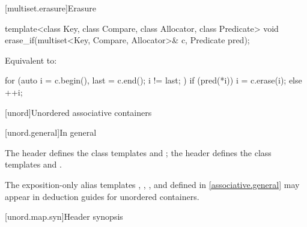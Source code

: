 [multiset.erasure]{Erasure}

%
\begin{itemdecl}
template<class Key, class Compare, class Allocator, class Predicate>
  void erase_if(multiset<Key, Compare, Allocator>& c, Predicate pred);
\end{itemdecl}

\begin{itemdescr}
\pnum
\effects
Equivalent to:
\begin{codeblock}
for (auto i = c.begin(), last = c.end(); i != last; ) {
  if (pred(*i)) {
    i = c.erase(i);
  } else {
    ++i;
  }
}
\end{codeblock}
\end{itemdescr}

[unord]{Unordered associative containers}

[unord.general]{In general}

\pnum
The header  defines the class templates
 and
; the header  defines the class templates
 and .

\pnum
The exposition-only alias templates ,
, , and 
defined in \ref{associative.general} may appear in deduction guides for unordered containers.

[unord.map.syn]{Header  synopsis}

